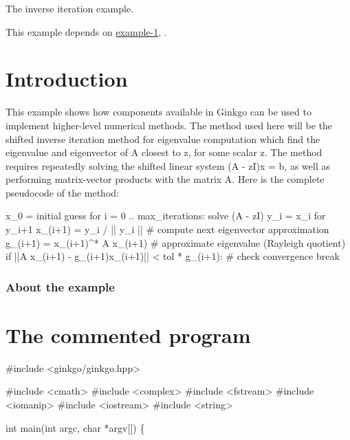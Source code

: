 The inverse iteration example.

This example depends on \hyperlink{example_1}{example-\/1}, .

 \label{_Intro}%
 \label{_Introduction}%
\section*{Introduction}

This example shows how components available in Ginkgo can be used to implement higher-\/level numerical methods. The method used here will be the shifted inverse iteration method for eigenvalue computation which find the eigenvalue and eigenvector of A closest to z, for some scalar z. The method requires repeatedly solving the shifted linear system (A -\/ zI)x = b, as well as performing matrix-\/vector products with the matrix {\ttfamily A}. Here is the complete pseudocode of the method\+:


\begin{DoxyCode}
x\_0 = initial guess
\textcolor{keywordflow}{for} i = 0 .. max\_iterations:
    solve (A - zI) y\_i = x\_i \textcolor{keywordflow}{for} y\_i+1
    x\_(i+1) = y\_i / || y\_i ||      # compute next eigenvector approximation
    g\_(i+1) = x\_(i+1)^* A x\_(i+1)  \textcolor{preprocessor}{# approximate eigenvalue (Rayleigh quotient)}
    \textcolor{keywordflow}{if} ||A x\_(i+1) - g\_(i+1)x\_(i+1)|| < tol * g\_(i+1):  \textcolor{preprocessor}{# check convergence}
\textcolor{preprocessor}{        break}
\end{DoxyCode}


\label{_Abouttheexample}%
\subsubsection*{About the example }

\label{_CommProg}%
 \section*{The commented program}


\begin{DoxyCode}
\textcolor{preprocessor}{#include <ginkgo/ginkgo.hpp>}


\textcolor{preprocessor}{#include <cmath>}
\textcolor{preprocessor}{#include <complex>}
\textcolor{preprocessor}{#include <fstream>}
\textcolor{preprocessor}{#include <iomanip>}
\textcolor{preprocessor}{#include <iostream>}
\textcolor{preprocessor}{#include <string>}


\textcolor{keywordtype}{int} main(\textcolor{keywordtype}{int} argc, \textcolor{keywordtype}{char} *argv[])
\{
\end{DoxyCode}


